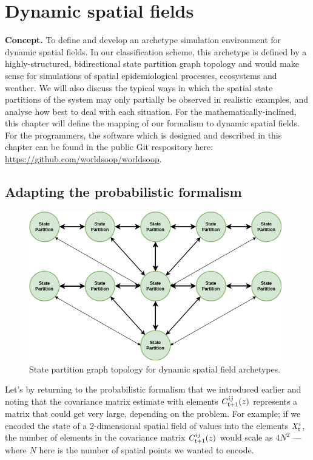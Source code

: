 \chapter{\sffamily Dynamic spatial fields}

{\bfseries\sffamily Concept.} To define and develop an archetype simulation environment for dynamic spatial fields. In our classification scheme, this archetype is defined by a highly-structured, bidirectional state partition graph topology and would make sense for simulations of spatial epidemiological processes, ecosystems and weather. We will also discuss the typical ways in which the spatial state partitions of the system may only partially be observed in realistic examples, and analyse how best to deal with each situation. For the mathematically-inclined, this chapter will define the mapping of our formalism to dynamic spatial fields. For the programmers, the software which is designed and described in this chapter can be found in the public Git respository here: \href{https://github.com/worldsoop/worldsoop}{https://github.com/worldsoop/worldsoop}.


\section{\sffamily Adapting the probabilistic formalism}

\begin{figure}[h]
\centering
\includegraphics[width=11cm]{images/chapter-7-state-partition-graph.drawio.png}
\caption{State partition graph topology for dynamic spatial field archetypes.}
\label{fig:state-partition-graph-dynamic-spatial-fields}
\end{figure}

Let's by returning to the probabilistic formalism that we introduced earlier and noting that the covariance matrix estimate with elements $C^{ij}_{{\sf t}+1}(z)$ represents a matrix that could get very large, depending on the problem. For example; if we encoded the state of a 2-dimensional spatial field of values into the elements $X^i_{\sf t}$, the number of elements in the covariance matrix $C^{ij}_{{\sf t}+1}(z)$ would scale as $4N^2$ --- where $N$ here is the number of spatial points we wanted to encode. 

